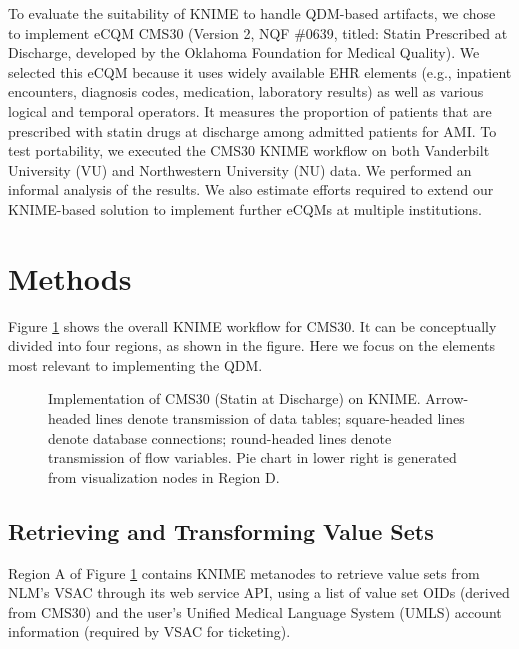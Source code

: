 \documentclass{article}
\begin{document}
To evaluate the suitability of KNIME to handle QDM-based artifacts, we chose to implement eCQM CMS30 (Version 2, NQF \#0639, titled: Statin Prescribed at Discharge\cite{krumholz_acc/aha_2008}, developed by the Oklahoma Foundation for Medical Quality). We selected this eCQM because it uses widely available EHR elements (e.g., inpatient encounters, diagnosis codes, medication, laboratory results) as well as various logical and temporal operators. It measures the proportion of patients that are prescribed with statin drugs at discharge among admitted patients for AMI. To test portability, we executed the CMS30 KNIME workflow on both Vanderbilt University (VU) and Northwestern University (NU) data. We performed an informal analysis of the results. We also  estimate efforts required to extend our KNIME-based solution to implement further eCQMs at multiple institutions.

\section{Methods}

Figure \ref{fig:knime-snapshot-1} shows the overall KNIME workflow for CMS30. It can be conceptually divided into four regions, as shown in the figure. Here we focus on the elements most relevant to implementing the QDM.

\begin{figure}
\centering
	\caption{Implementation of CMS30 (Statin at Discharge) on KNIME. Arrow-headed lines denote transmission of data tables; square-headed lines denote database connections; round-headed lines denote transmission of flow variables. Pie chart in lower right is generated from visualization nodes in Region D.
	}\label{fig:knime-snapshot-1}
\end{figure}

\subsection{Retrieving and Transforming Value Sets}

Region A of Figure \ref{fig:knime-snapshot-1} contains KNIME metanodes to retrieve value sets from NLM's VSAC through its web service API, using a list of value set OIDs (derived from CMS30) and the user's Unified Medical Language System (UMLS) account information (required by VSAC for ticketing).
\end{document}
